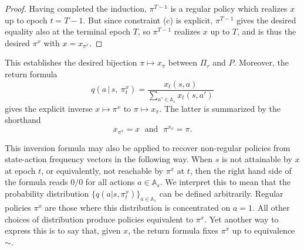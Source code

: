 \documentclass{article}
\theoremstyle{definition}
\numberwithin{equation}{section}
\begin{document}
{\begin{proof}
    Having completed the induction,
    $\pi^{T-1}$ is a regular policy which realizes $x$ up to epoch $t=T-1$.  But since constraint (c) is explicit, $\pi^{T-1}$
    gives the desired equality also at the terminal epoch $T$, so $\pi^{T-1}$ realizes $x$ up to $T$, and
    is thus the desired
    $\pi^x$ with $x = x_{\pi^x}$.
\end{proof}





This
establishes the desired bijection $\pi \mapsto x_\pi$ between
$\Pi_r$ and $P$.  Moreover, the return formula
\begin{equation}
\label{pi_x_equation}
q(a \,|\, s,\ \pi^{x}_t) = \frac{x_t(s, a)}{\sum_{a' \in \mathbb{A}_s}x_t(s, a')}
\end{equation}
gives the explicit inverse $x\mapsto \pi^x$ to
$\pi \mapsto x_\pi$. The latter is summarized by the shorthand
$$
x_{\pi^x} = x \;\mbox{ and }\; \pi^{x_\pi} = \pi.
$$

This inversion formula may also be applied to recover non-regular
policies from state-action frequency vectors in the following way. 
When $s$ is not attainable by $x$
at epoch $t$, or equivalently, not reachable by $\pi^x$ at $t$, then the right hand side of the formula reads $0/0$ for all actions $a \in \mathbb{A}_s$. We interpret this to mean that the probability distribution $\{q(a | s, \pi^{x}_t)\}_{a \in \mathbb{A}_s}$ can be defined arbitrarily.
Regular policies $\pi^x$ are those where this distribution is concentrated on $a=1$. 
All other choices of distribution produce policies equivalent to $\pi^x$.
Yet another way to express this is to say that, given $x$, the return formula fixes
$\pi^x$ up to equivalence $\sim$.



}
\end{document}

